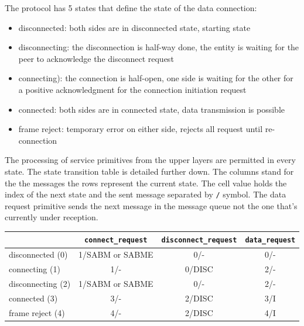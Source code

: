 \documentclass[a4paper]{article}
\begin{document}
The protocol has 5 states that define the state of the data connection:
\begin{itemize}
    \item disconnected: both sides are in disconnected state, starting state
    \item disconnecting: the disconnection is half-way done, the entity is waiting for the peer to acknowledge the
          disconnect request
    \item connecting): the connection is half-open, one side is waiting for the other for a positive acknowledgment for
          the
          connection initiation request
    \item connected: both sides are in connected state, data transmission is possible
    \item frame reject: temporary error on either side, rejects all request until re-connection
\end{itemize}

The processing of service primitives from the upper layers are permitted in every state. The state transition table is
detailed further down. The columns stand for the the messages the rows represent the current state. The cell value
holds the index of the next state and the sent message separated by \verb./. symbol. The data
request primitive sends the next message in the message queue not the one that's currently under reception.

{\footnotesize
\begin{center}
    \begin{tabular}{|l|c|c|c|}
        \hline
                          & \verb!connect_request! & \verb!disconnect_request! & \verb!data_request!  \\
        \hline
        disconnected (0)  & 1/SABM or SABME             & 0/-                         & 0/-                          \\
        \hline
        connecting (1)    & 1/-                         & 0/DISC                      & 2/-                          \\
        \hline
        disconnecting (2) & 1/SABM or SABME             & 0/-                         & 2/-                          \\
        \hline
        connected (3)     & 3/-                         & 2/DISC                      & 3/I                          \\
        \hline
        frame reject (4)  & 4/-                         & 2/DISC                      & 4/I                          \\
        \hline
    \end{tabular}
\end{center}
}
\end{document}

